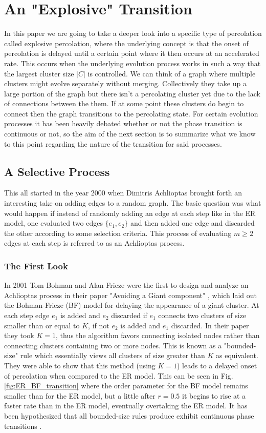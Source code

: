 \section{An "Explosive" Transition}
In this paper we are going to take a deeper look into a specific type of percolation called explosive percolation, where the underlying concept is that the onset of percolation is delayed until a certain point where it then occurs at an accelerated rate.
This occurs when the underlying evolution process works in such a way that the largest cluster size $|C|$ is controlled.
We can think of a graph where multiple clusters might evolve separately without merging.
Collectively they take up a large portion of the graph but there isn't a percolating cluster yet due to the lack of connections between the them.
If at some point these clusters do begin to connect then the graph transitions to the percolating state.
For certain evolution processes it has been heavily debated whether or not the phase transition is continuous or not, so the aim of the next section is to summarize what we know to this point regarding the nature of the transition for said processes.

\subsection{A Selective Process}
This all started in the year 2000 when Dimitris Achlioptas brought forth an interesting take on adding edges to a random graph.
The basic question was what would happen if instead of randomly adding an edge at each step like in the ER model, one evaluated two edges $\{e_1, e_2\}$ and then added one edge and discarded the other according to some selection criteria.
This process of evaluating $m \ge 2$ edges at each step is referred to as an Achlioptas process.

\subsubsection{The First Look}
In 2001 Tom Bohman and Alan Frieze were the first to design and analyze an Achlioptas process in their paper "Avoiding a Giant component" \cite{BF}, which laid out the Bohman-Frieze (BF) model for delaying the appearance of a giant cluster.
At each step edge $e_1$ is added and $e_2$ discarded if $e_1$ connects two clusters of size smaller than or equal to $K$, if not $e_2$ is added and $e_1$ discarded.
In their paper they took $K = 1$, thus the algorithm favors connecting isolated nodes rather than connecting clusters containing two or more nodes.
This is known as a "bounded-size" rule which essentially views all clusters of size greater than $K$ as equivalent.
They were able to show that this method (using $K = 1$) leads to a delayed onset of percolation when compared to the ER model.
This can be seen in Fig. \ref{fig:ER_BF_transition} where the order parameter for the BF model remains smaller than for the ER model, but a little after $r = 0.5$ it begins to rise at a faster rate than in the ER model, eventually overtaking the ER model.
It has been hypothesized that all bounded-size rules produce exhibit continuous phase transitions \cite{Spencer_Wormald}.

